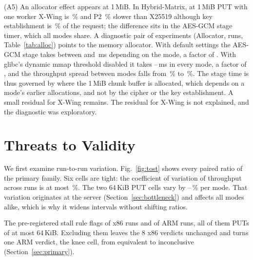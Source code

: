 \documentclass[conference]{IEEEtran}
\newcommand{\lab}[1]{\textsf{#1}}
\begin{document}
(A5) An allocator effect appears at 1\,MiB. In \lab{Hybrid-Matrix}, at 1\,MiB PUT with one worker X-Wing is
\RevMidPutXwingDeficit\,\% and P2 \RevMidPutStudyHybridDeficit\,\% slower than X25519 although key
establishment is \RevKeShareXwingMidPut\,\% of the request; the difference sits in the AES-GCM
stage timer, which all modes share. A diagnostic pair of experiments (\lab{Allocator}, \AudAllocRuns{} runs,
Table~\ref{tab:alloc}) points to the memory allocator. With default settings the AES-GCM stage
takes between \AudAllocDefaultLo{} and \AudAllocDefaultHi\,ms depending on the mode, a factor of
\AudAllocDefaultSpread. With glibc's dynamic mmap threshold disabled it takes
\AudAllocFixedLo--\AudAllocFixedHi\,ms in every mode, a factor of \AudAllocFixedSpread, and the
throughput spread between modes falls from \AudAllocDefaultThrSpread\,\% to
\AudAllocFixedThrSpread\,\%. The stage time is thus governed by where the 1\,MiB chunk buffer is
allocated, which depends on a mode's earlier allocations, and not by the cipher or the key
establishment. A small residual for X-Wing remains.
The residual for X-Wing is not explained, and the diagnostic was exploratory.

\begin{table}[t]
\caption{1\,MiB PUT, one worker: AES-GCM stage time and throughput with the default allocator and with glibc's mmap threshold fixed at 256\,MiB (\lab{Allocator}, five runs each)}
\label{tab:alloc}
\centering\footnotesize

\end{table}

\section{Threats to Validity}\label{sec:validity}\label{sec:pending}
We first examine run-to-run variation.
Fig.~\ref{fig:tost} shows every paired ratio of the primary family. Six cells are tight: the
coefficient of variation of throughput across runs is at most \RevCvQuietMax\,\%. The two
64\,KiB PUT cells vary by \RevCvNoisyLo--\RevCvNoisyHi\,\% per mode. That variation originates at
the server (Section~\ref{sec:bottleneck}) and affects all modes alike, which is why it widens
intervals without shifting ratios.

The pre-registered stall rule flags \RevStalls{} of \RevRuns{} x86 runs and \ArmStalls{} of \ArmRuns{}
ARM runs, all of them PUTs of at most 64\,KiB. Excluding them leaves the 8 x86 verdicts
unchanged and turns one ARM verdict, the knee cell, from equivalent to inconclusive
(Section~\ref{sec:primary}).
\end{document}
